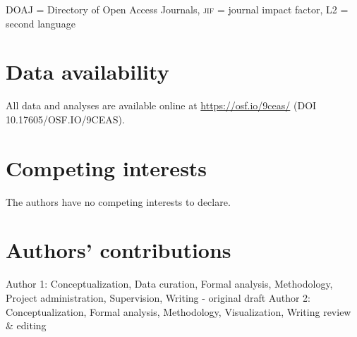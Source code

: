 \documentclass[cm,linguex]{glossa}
\begin{document}
\textsc{DOAJ} = Directory of Open Access Journals,
\textsc{jif} = journal impact factor,
\textsc{L2} = second language

\hypertarget{data-availabilitysupplementary-files-optional}{%
\section*{Data availability}\label{data-availabilitysupplementary-files-optional}}

All data and analyses are available online at \url{https://osf.io/9ceas/} (DOI 10.17605/OSF.IO/9CEAS).

\hypertarget{competing-interests-mandatory}{%
\section*{Competing interests}\label{competing-interests-mandatory}}

The authors have no competing interests to declare.

\hypertarget{contrib}{%
\section*{Authors' contributions}\label{contrib}}

Author 1: Conceptualization, Data curation, Formal analysis, Methodology, Project administration, Supervision, Writing - original draft
Author 2: Conceptualization, Formal analysis, Methodology, Visualization, Writing review \& editing


\end{document}
